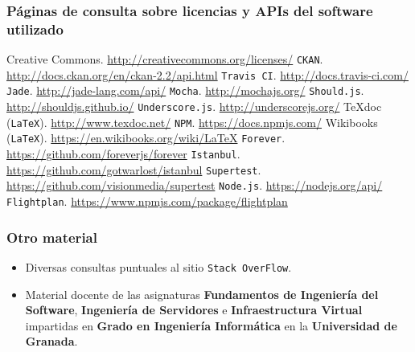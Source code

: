 \subsubsection*{Páginas de consulta sobre licencias y APIs del software utilizado}
 Creative Commons. \url{http://creativecommons.org/licenses/}
 {\tt CKAN}. \url{http://docs.ckan.org/en/ckan-2.2/api.html}
 {\tt Travis CI}. \url{http://docs.travis-ci.com/}
 {\tt Jade}. \url{http://jade-lang.com/api/}
 {\tt Mocha}. \url{http://mochajs.org/}
 {\tt Should.js}. \url{http://shouldjs.github.io/}
 {\tt Underscore.js}. \url{http://underscorejs.org/}
 TeXdoc ({\tt LaTeX}). \url{http://www.texdoc.net/}
 {\tt NPM}. \url{https://docs.npmjs.com/}
 Wikibooks ({\tt LaTeX}). \url{https://en.wikibooks.org/wiki/LaTeX}
 {\tt Forever}. \url{https://github.com/foreverjs/forever}
 {\tt Istanbul}. \url{https://github.com/gotwarlost/istanbul}
 {\tt Supertest}. \url{https://github.com/visionmedia/supertest}
 {\tt Node.js}. \url{https://nodejs.org/api/}
 {\tt Flightplan}. \url{https://www.npmjs.com/package/flightplan}

\bigskip
\subsubsection*{Otro material}
\begin{itemize}
	\item Diversas consultas puntuales al sitio {\tt Stack OverFlow}.
	\item Material docente de las asignaturas \textbf{Fundamentos de Ingeniería del Software}, \textbf{Ingeniería de Servidores} e \textbf{Infraestructura Virtual} impartidas en \textbf{Grado en Ingeniería Informática} en la \textbf{Universidad de Granada}.
\end{itemize}